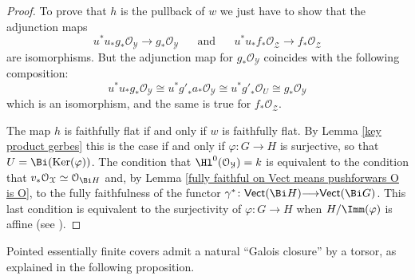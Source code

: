 \documentclass[12pt,reqno]{amsart}
\theoremstyle{plain}
\theoremstyle{definition}
\numberwithin{thm}{section}
\newcounter{x}\setcounter{x}{1}
\theoremstyle{plain}
\begin{document}
\begin{proof}
To prove that $h$ is the pullback of $w$ we just have to show that the adjunction maps 
$$u^*u_*g_*{{\mathcal O}}_{{\mathcal Y}}{\longrightarrow} g_*{{\mathcal O}}_{{\mathcal Y}}\hspace{20pt}\text{and}\hspace{20pt} u^*u_*{f}_*{{\mathcal O}}_{{\mathcal Z}}{\longrightarrow} 
f_*{{\mathcal O}}_{{\mathcal Z}}$$ are isomorphisms. But the adjunction map for $g_*{{\mathcal O}}_{{\mathcal Y}}$ coincides with the following 
composition: $$u^*u_*g_*{{\mathcal O}}_{{\mathcal Y}}\cong u^*{g'}_*a_*{{\mathcal O}}_{{\mathcal Y}}\cong u^*{g'}_*{{\mathcal O}}_U\cong g_*{{\mathcal O}}_{{\mathcal Y}}$$ 
which is an isomorphism, and the same is true for ${f}_*{{\mathcal O}}_{{\mathcal Z}}$.

The map $h$ is faithfully flat if and only if $w$ is faithfully flat. By
Lemma \ref{key product gerbes} this is the case if and only if $\varphi\colon G{\longrightarrow} H$ is
surjective, so that $U=\Bi ({{\rm Ker}}(\varphi))$. The condition that $\Hl^0({\mathcal{O}_{\mathcal{Y}}})=k$ is equivalent to
the condition that $v_*{\mathcal{O}_{\mathcal{X}}} \simeq {\mathcal{O}_{{\Bi H}}}$ and, by Lemma
\ref{fully faithful on Vect means pushforwars O is O}, to the fully faithfulness of the functor
$\gamma^*\colon {\text{\sf Vect}}(\Bi H){\longrightarrow} {\text{\sf Vect}}(\Bi G)$. This last condition is equivalent to the surjectivity of $\varphi\colon G{\longrightarrow} H$ when $H/\Imm(\varphi)$ is affine (see \cite[Remark B.7]{TZ}).
\end{proof}

Pointed essentially finite covers admit a natural ``Galois closure'' by a torsor, as explained 
in the following proposition.
\end{document}
